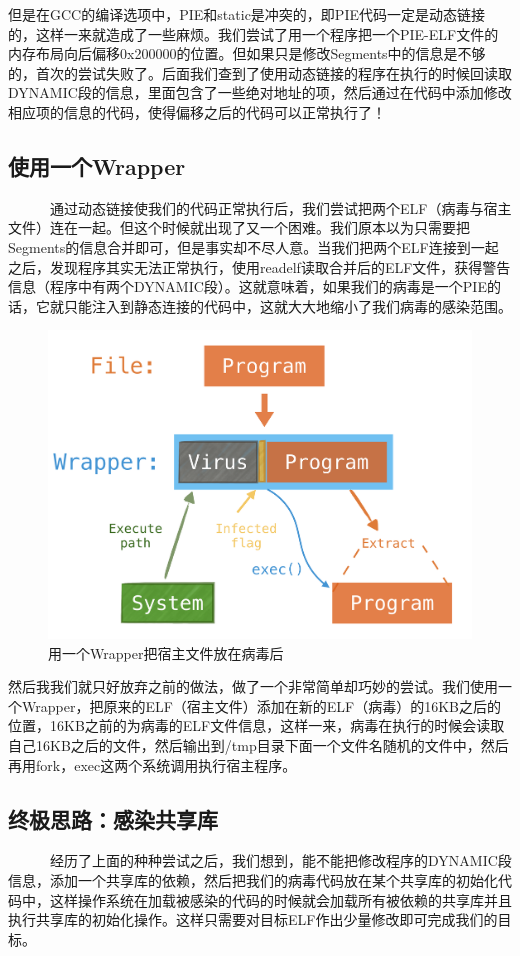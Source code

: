 \documentclass[a4paper, 11pt]{article}
\begin{document}
但是在GCC的编译选项中，PIE和static是冲突的，即PIE代码一定是动态链接的，这样一来就造成了一些麻烦。我们尝试了用一个程序把一个PIE-ELF文件的内存布局向后偏移0x200000的位置。但如果只是修改Segments中的信息是不够的，首次的尝试失败了。后面我们查到了使用动态链接的程序在执行的时候回读取DYNAMIC段的信息，里面包含了一些绝对地址的项，然后通过在代码中添加修改相应项的信息的代码，使得偏移之后的代码可以正常执行了！

\subsection{使用一个Wrapper}
~~~~~~通过动态链接使我们的代码正常执行后，我们尝试把两个ELF（病毒与宿主文件）连在一起。但这个时候就出现了又一个困难。我们原本以为只需要把Segments的信息合并即可，但是事实却不尽人意。当我们把两个ELF连接到一起之后，发现程序其实无法正常执行，使用readelf读取合并后的ELF文件，获得警告信息（程序中有两个DYNAMIC段）。这就意味着，如果我们的病毒是一个PIE的话，它就只能注入到静态连接的代码中，这就大大地缩小了我们病毒的感染范围。
	\begin{figure}[htbp]
		\centering
		\includegraphics[width = \textwidth]{figures/fig2_wrapper}
		\caption{用一个Wrapper把宿主文件放在病毒后}
		\label{fig:way3}
	\end{figure}
然后我我们就只好放弃之前的做法，做了一个非常简单却巧妙的尝试。我们使用一个Wrapper，把原来的ELF（宿主文件）添加在新的ELF（病毒）的16KB之后的位置，16KB之前的为病毒的ELF文件信息，这样一来，病毒在执行的时候会读取自己16KB之后的文件，然后输出到/tmp目录下面一个文件名随机的文件中，然后再用fork，exec这两个系统调用执行宿主程序。

\subsection{终极思路：感染共享库}
~~~~~~经历了上面的种种尝试之后，我们想到，能不能把修改程序的DYNAMIC段信息，添加一个共享库的依赖，然后把我们的病毒代码放在某个共享库的初始化代码中，这样操作系统在加载被感染的代码的时候就会加载所有被依赖的共享库并且执行共享库的初始化操作。这样只需要对目标ELF作出少量修改即可完成我们的目标。
\end{document}
